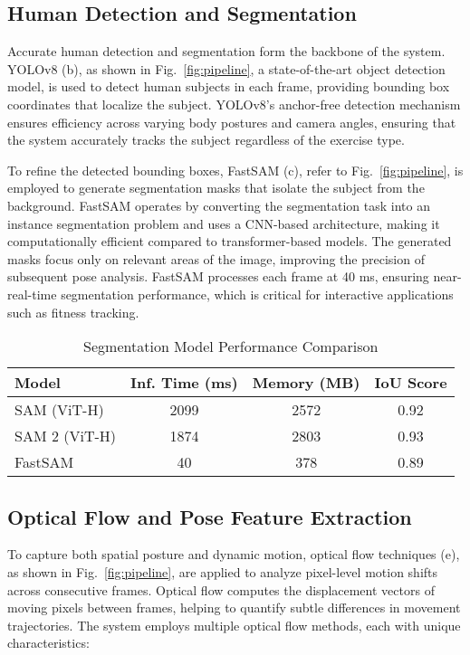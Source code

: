 \documentclass[conference]{IEEEtran}
\begin{document}
\subsection{Human Detection and Segmentation} 
Accurate human detection and segmentation form the backbone of the system. YOLOv8 (b), as shown in Fig.~\ref{fig:pipeline}, a state-of-the-art object detection model, is used to detect human subjects in each frame, providing bounding box coordinates that localize the subject. YOLOv8's anchor-free detection mechanism ensures efficiency across varying body postures and camera angles, ensuring that the system accurately tracks the subject regardless of the exercise type.

To refine the detected bounding boxes, FastSAM (c), refer to Fig.~\ref{fig:pipeline}, is employed to generate segmentation masks that isolate the subject from the background. FastSAM operates by converting the segmentation task into an instance segmentation problem and uses a CNN-based architecture, making it computationally efficient compared to transformer-based models. The generated masks focus only on relevant areas of the image, improving the precision of subsequent pose analysis. FastSAM processes each frame at 40 ms, ensuring near-real-time segmentation performance, which is critical for interactive applications such as fitness tracking.

\begin{table}[h]
\caption{Segmentation Model Performance Comparison}
\centering
\begin{tabular}{|l|c|c|c|}
\hline
\textbf{Model} & \textbf{Inf. Time (ms)} & \textbf{Memory (MB)} & \textbf{IoU Score} \\
\hline
SAM (ViT-H) & 2099 & 2572 & 0.92 \\
\hline
SAM 2 (ViT-H) & 1874 & 2803 & 0.93 \\
\hline
FastSAM & 40 & 378 & 0.89 \\
\hline
\end{tabular}
\end{table}

\subsection{Optical Flow and Pose Feature Extraction} 
To capture both spatial posture and dynamic motion, optical flow techniques (e), as shown in Fig.~\ref{fig:pipeline}, are applied to analyze pixel-level motion shifts across consecutive frames. Optical flow computes the displacement vectors of moving pixels between frames, helping to quantify subtle differences in movement trajectories. The system employs multiple optical flow methods, each with unique characteristics:
\end{document}
